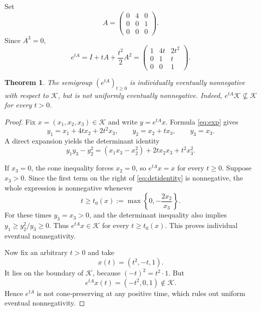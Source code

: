 \documentclass[11pt]{article}
\newtheorem{theorem}{Theorem}
\newcommand{\K}{\mathcal K}
\begin{document}
Set
\begin{equation}\label{eq:A}
 A=\begin{pmatrix}
 0&4&0\\0&0&1\\0&0&0
 \end{pmatrix}.
\end{equation}
Since $A^3=0$,
\begin{equation}\label{eq:exp}
 e^{tA}=I+tA+\frac{t^2}{2}A^2
 =\begin{pmatrix}
 1&4t&2t^2\\0&1&t\\0&0&1
 \end{pmatrix}.
\end{equation}

\begin{theorem}\label{thm:main}
The semigroup $(e^{tA})_{t\geq0}$ is individually eventually nonnegative with
respect to $\K$, but is not uniformly eventually nonnegative.  Indeed,
$e^{tA}\K\not\subseteq\K$ for every $t>0$.
\end{theorem}

\begin{proof}
Fix $x=(x_1,x_2,x_3)\in\K$ and write $y=e^{tA}x$.  Formula
\eqref{eq:exp} gives
\[
 y_1=x_1+4tx_2+2t^2x_3,\qquad
 y_2=x_2+tx_3,\qquad y_3=x_3.
\]
A direct expansion yields the determinant identity
\begin{equation}\label{eq:detidentity}
 y_1y_3-y_2^2
 =(x_1x_3-x_2^2)+2t x_2x_3+t^2x_3^2.
\end{equation}

If $x_3=0$, the cone inequality forces $x_2=0$, so
$e^{tA}x=x$ for every $t\geq0$.  Suppose $x_3>0$.  Since the first term on
the right of \eqref{eq:detidentity} is nonnegative, the whole expression is
nonnegative whenever
\[
 t\geq t_0(x):=\max\left\{0,-\frac{2x_2}{x_3}\right\}.
\]
For these times $y_3=x_3>0$, and the determinant inequality also implies
$y_1\geq y_2^2/y_3\geq0$.  Thus $e^{tA}x\in\K$ for every
$t\geq t_0(x)$.  This proves individual eventual nonnegativity.

Now fix an arbitrary $t>0$ and take
\begin{equation}\label{eq:witness}
 x(t)=(t^2,-t,1).
\end{equation}
It lies on the boundary of $\K$, because $(-t)^2=t^2\cdot1$.  But
\[
 e^{tA}x(t)=(-t^2,0,1)\notin\K.
\]
Hence $e^{tA}$ is not cone-preserving at any positive time, which rules out
uniform eventual nonnegativity.
\end{proof}
\end{document}
